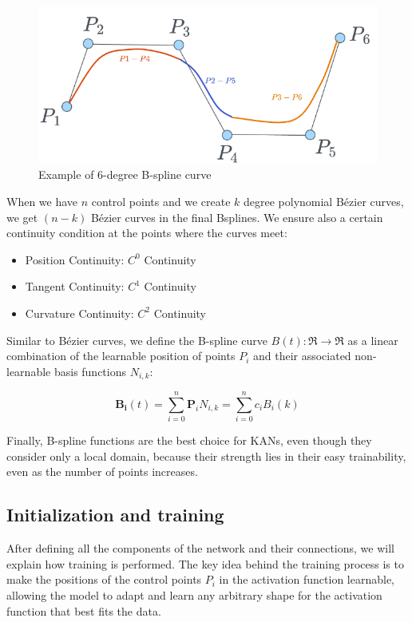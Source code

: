 \documentclass[12pt,a4paper]{article}
\begin{document}
\begin{figure}[H]
    \centering
    \includegraphics[width=0.5\linewidth]{Images/bezier4.png}
    \caption{Example of 6-degree B-spline curve}
    \label{fig:bezier4}
\end{figure}

When we have $n$ control points and we create $k$ degree polynomial Bézier curves, we get $(n-k)$ Bézier curves in the final Bsplines. We ensure also a certain continuity condition at the points where the curves meet:
\begin{itemize}
    \item Position Continuity: $C^0$ Continuity 
    \item Tangent Continuity: $C^1$ Continuity  
    \item Curvature Continuity: $C^2$ Continuity 
\end{itemize}

Similar to Bézier curves, we define the B-spline curve \( B(t): \Re \to \Re \) as a linear combination of the learnable position of points \( P_i \) and their associated non-learnable basis functions \( N_{i,k} \):


\[
\mathbf{B_i}(t) = \sum_{i=0}^n \mathbf{P}_i N_{i,k} = \sum_{i=0}^n c_i B_{i}(k)
\]

Finally, B-spline functions are the best choice for KANs, even though they consider only a local domain, because their strength lies in their easy trainability, even as the number of points increases.


\subsection{Initialization and training}
After defining all the components of the network and their connections, we will explain how training is performed. The key idea behind the training process is to make the positions of the control points $P_i$ in the activation function learnable, allowing the model to adapt and learn any arbitrary shape for the activation function that best fits the data. \cite{KAN,kan_intro}
\end{document}
